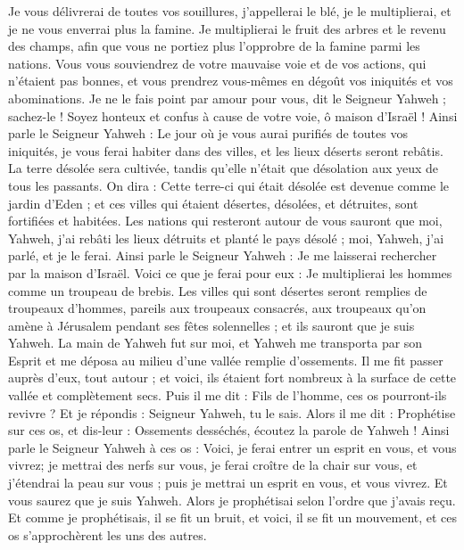 \begin{multicols}{2}
Je vous délivrerai de toutes vos souillures, j'appellerai le blé, je le multiplierai, et je ne vous enverrai plus la famine.
Je multiplierai le fruit des arbres et le revenu des champs, afin que vous ne portiez plus l'opprobre de la famine parmi les nations.
Vous vous souviendrez de votre mauvaise voie et de vos actions, qui n'étaient pas bonnes, et vous prendrez vous-mêmes en dégoût vos iniquités et vos abominations.
Je ne le fais point par amour pour vous, dit le Seigneur Yahweh ; sachez-le ! Soyez honteux et confus à cause de votre voie, ô maison d'Israël !
Ainsi parle le Seigneur Yahweh : Le jour où je vous aurai purifiés de toutes vos iniquités, je vous ferai habiter dans des villes, et les lieux déserts seront rebâtis.
La terre désolée sera cultivée, tandis qu’elle n’était que désolation aux yeux de tous les passants.
On dira : Cette terre-ci qui était désolée est devenue comme le jardin d'Eden ; et ces villes qui étaient désertes, désolées, et détruites, sont fortifiées et habitées\FTNT{}.
Les nations qui resteront autour de vous sauront que moi, Yahweh, j'ai rebâti les lieux détruits et planté le pays désolé ; moi, Yahweh, j'ai parlé, et je le ferai.
Ainsi parle le Seigneur Yahweh : Je me laisserai rechercher par la maison d'Israël. Voici ce que je ferai pour eux : Je multiplierai les hommes comme un troupeau de brebis.
Les villes qui sont désertes seront remplies de troupeaux d'hommes, pareils aux troupeaux consacrés, aux troupeaux qu’on amène à Jérusalem pendant ses fêtes solennelles ; et ils sauront que je suis Yahweh.
\VerseOne{}La main de Yahweh fut sur moi, et Yahweh me transporta par son Esprit et me déposa au milieu d'une vallée remplie d'ossements\FTNT{}.
Il me fit passer auprès d'eux, tout autour ; et voici, ils étaient fort nombreux à la surface de cette vallée et complètement secs.
Puis il me dit : Fils de l’homme, ces os pourront-ils revivre ? Et je répondis : Seigneur Yahweh, tu le sais.
Alors il me dit : Prophétise sur ces os, et dis-leur : Ossements desséchés, écoutez la parole de Yahweh !
Ainsi parle le Seigneur Yahweh à ces os : Voici, je ferai entrer un esprit en vous, et vous vivrez\FTNT{};
je mettrai des nerfs sur vous, je ferai croître de la chair sur vous, et j'étendrai la peau sur vous ; puis je mettrai un esprit en vous, et vous vivrez. Et vous saurez que je suis Yahweh.
Alors je prophétisai selon l’ordre que j’avais reçu. Et comme je prophétisais, il se fit un bruit, et voici, il se fit un mouvement, et ces os s'approchèrent les uns des autres.

\end{multicols}
